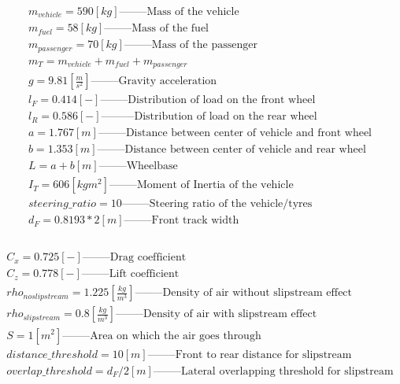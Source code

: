 \documentclass{report}
\begin{document}
\begin{equation*}
\begin{aligned}
m_{vehicle} = 590 [kg] \text{--------Mass of the vehicle}\\
m_{fuel} = 58 [kg] \text{--------Mass of the fuel}\\
m_{passenger} = 70 [kg] \text{--------Mass of the passenger}\\
m_T = m_{vehicle} + m_{fuel}+ m_{passenger} \\
g = 9.81 [\frac{m}{s^2}] \text{--------Gravity acceleration}\\
l_F = 0.414 [-] \text{--------Distribution of load on the front wheel}\\
l_R = 0.586 [-] \text{---------Distribution of load on the rear wheel}\\
a = 1.767 [m] \text{--------Distance between center of vehicle and front wheel}\\
b = 1.353 [m] \text{--------Distance between center of vehicle and rear wheel}\\
L = a + b [m] \text{--------Wheelbase}\\
I_T = 606 [kg m^2] \text{--------Moment of Inertia of the vehicle}\\
steering\_ratio = 10 \text{--------Steering ratio of the vehicle/tyres}\\
d_F = 0.8193*2 [m] \text{--------Front track width}\\\\
\end{aligned}
\end{equation*}

\begin{equation*}
\begin{aligned}
C_x = 0.725 [-] \text{--------Drag coefficient}\\
C_z = 0.778 [-] \text{--------Lift coefficient}\\
rho_{noslipstream} = 1.225 [\frac{kg}{m^3}] \text{--------Density of air without slipstream effect}\\
rho_{slipstream} = 0.8 [\frac{kg}{m^3}] \text{--------Density of air with slipstream effect}\\
S = 1 [m^2] \text{--------Area on which the air goes through}\\
distance\_threshold = 10 [m] \text{--------Front to rear distance for slipstream}\\
overlap\_threshold = d_F/2 [m] \text{--------Lateral overlapping threshold for slipstream}\\\\
\end{aligned}
\end{equation*}
\end{document}
